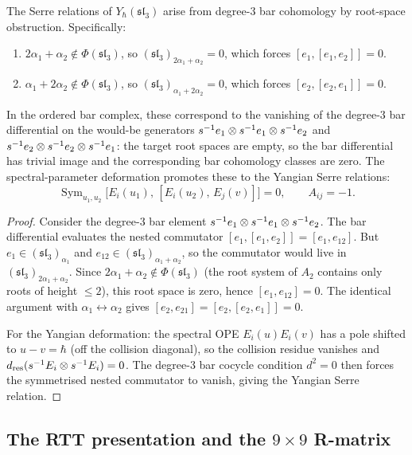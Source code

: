 \begin{proposition}
\label{prop:sl3-serre}
The Serre relations of $Y_\hbar(\mathfrak{sl}_3)$ arise from degree-$3$
bar cohomology by root-space obstruction. Specifically:
\begin{enumerate}[label=(\roman*)]
\item $2\alpha_1+\alpha_2\notin\Phi(\mathfrak{sl}_3)$, so
$(\mathfrak{sl}_3)_{2\alpha_1+\alpha_2}=0$, which forces
$[e_1,[e_1,e_2]]=0$.
\item $\alpha_1+2\alpha_2\notin\Phi(\mathfrak{sl}_3)$, so
$(\mathfrak{sl}_3)_{\alpha_1+2\alpha_2}=0$, which forces
$[e_2,[e_2,e_1]]=0$.
\end{enumerate}
In the ordered bar complex, these correspond to the vanishing of
the degree-$3$ bar differential on the would-be generators
$s^{-1}e_1\otimes s^{-1}e_1\otimes s^{-1}e_2$ and
$s^{-1}e_2\otimes s^{-1}e_2\otimes s^{-1}e_1$:
the target root spaces are empty, so the bar differential has
trivial image and the corresponding bar cohomology classes are zero.
The spectral-parameter deformation promotes these to the Yangian
Serre relations:
\[
\operatorname{Sym}_{u_1,u_2}
\big[E_i(u_1),\,[E_i(u_2),\,E_j(v)]\big]=0,
\qquad
A_{ij}=-1.
\]
\end{proposition}

\begin{proof}
Consider the degree-$3$ bar element
$s^{-1}e_1\otimes s^{-1}e_1\otimes s^{-1}e_2$.
The bar differential evaluates the nested commutator
$[e_1,[e_1,e_2]]=[e_1,e_{12}]$. But $e_1\in(\mathfrak{sl}_3)_{\alpha_1}$
and $e_{12}\in(\mathfrak{sl}_3)_{\alpha_1+\alpha_2}$, so the commutator
would live in $(\mathfrak{sl}_3)_{2\alpha_1+\alpha_2}$. Since
$2\alpha_1+\alpha_2\notin\Phi(\mathfrak{sl}_3)$ (the root system of
$A_2$ contains only roots of height $\le 2$), this root space is zero,
hence $[e_1,e_{12}]=0$. The identical argument with $\alpha_1\leftrightarrow\alpha_2$
gives $[e_2,e_{21}]=[e_2,[e_2,e_1]]=0$.

For the Yangian deformation: the spectral OPE
$E_i(u)E_i(v)$ has a pole shifted to $u-v=\hbar$ (off the collision
diagonal), so the collision residue vanishes and
$d_{\mathrm{res}}(s^{-1}E_i\otimes s^{-1}E_i)=0$. The degree-$3$
bar cocycle condition $d^2=0$ then forces the symmetrised nested
commutator to vanish, giving the Yangian Serre relation.
\end{proof}

\subsection{The RTT presentation and the \texorpdfstring{$9\times 9$}{9x9} R-matrix}

